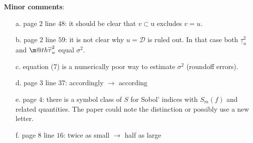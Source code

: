 \documentclass[10pt,a4paper]{article}
\makeatletter
\newcommand{\ov}[1]{
  \m@th\overline{\mbox{#1}\raisebox{2mm}{}}
}
\makeatother
\begin{document}
\textbf{Minor comments}:
\begin{itemize}
\item[a.] page $2$ line $48$: it should be clear that $v \subset $u excludes $v = u$.

\item[b.] page $2$ line $59$: it is not clear why $u = \mathcal{D}$ is ruled out. In that case both $\underline{\tau}_u^2$ and $\ov{$\tau$}_u^2$ equal $\sigma^2$.

\item[c.] equation (7) is a numerically poor way to estimate $\sigma^2$ (roundoff errors).

\item[d.] page $3$ line $37$: accordingly $\rightarrow$ according

\item[e.] page $4$: there is a symbol class of $S$ for Sobol' indices with $S_m(f)$ and related quantities. The paper could note the distinction or possibly use a
new letter.

\item[f.] page $8$ line $16$: twice as small  $\rightarrow$ half as large
\end{itemize}
\end{document}
